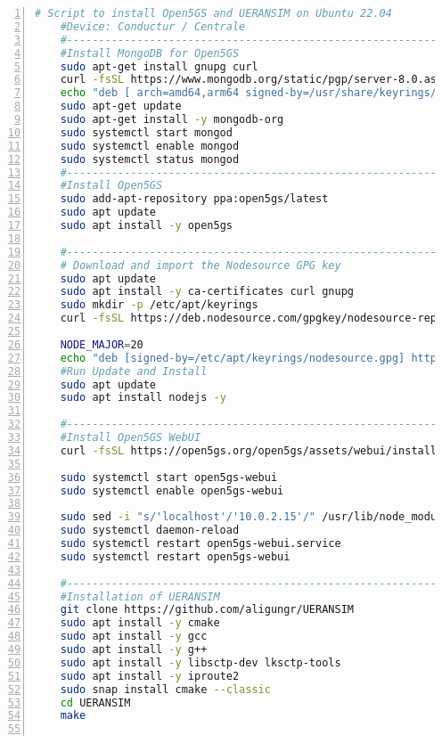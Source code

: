 \begin{lstlisting}[basicstyle=\small, frame=single, breaklines=true, postbreak=\mbox{\textcolor{red}{$\hookrightarrow$}\space}, escapeinside ={\%,}, escapechar={!}, numbers=left, language=sh, caption=Script]
    # Script to install Open5GS and UERANSIM on Ubuntu 22.04
    #Device: Conductur / Centrale
    #-----------------------------------------------------------
    #Install MongoDB for Open5GS
    sudo apt-get install gnupg curl
    curl -fsSL https://www.mongodb.org/static/pgp/server-8.0.asc | sudo gpg -o /usr/share/keyrings/mongodb-server-8.0.gpg --dearmor
    echo "deb [ arch=amd64,arm64 signed-by=/usr/share/keyrings/mongodb-server-8.0.gpg ] https://repo.mongodb.org/apt/ubuntu noble/mongodb-org/8.0 multiverse" | sudo tee /etc/apt/sources.list.d/mongodb-org-8.0.list
    sudo apt-get update
    sudo apt-get install -y mongodb-org
    sudo systemctl start mongod
    sudo systemctl enable mongod
    sudo systemctl status mongod
    #-----------------------------------------------------------
    #Install Open5GS
    sudo add-apt-repository ppa:open5gs/latest
    sudo apt update
    sudo apt install -y open5gs

    #-----------------------------------------------------------
    # Download and import the Nodesource GPG key
    sudo apt update
    sudo apt install -y ca-certificates curl gnupg
    sudo mkdir -p /etc/apt/keyrings
    curl -fsSL https://deb.nodesource.com/gpgkey/nodesource-repo.gpg.key | sudo gpg --dearmor -o /etc/apt/keyrings/nodesource.gpg

    NODE_MAJOR=20
    echo "deb [signed-by=/etc/apt/keyrings/nodesource.gpg] https://deb.nodesource.com/node_$NODE_MAJOR.x nodistro main" | sudo tee /etc/apt/sources.list.d/nodesource.list
    #Run Update and Install
    sudo apt update
    sudo apt install nodejs -y

    #-----------------------------------------------------------
    #Install Open5GS WebUI
    curl -fsSL https://open5gs.org/open5gs/assets/webui/install | sudo -E bash -

    sudo systemctl start open5gs-webui
    sudo systemctl enable open5gs-webui

    sudo sed -i "s/'localhost'/'10.0.2.15'/" /usr/lib/node_modules/open5gs/server/index.js # Change localhost
    sudo systemctl daemon-reload
    sudo systemctl restart open5gs-webui.service
    sudo systemctl restart open5gs-webui

    #-----------------------------------------------------------
    #Installation of UERANSIM
    git clone https://github.com/aligungr/UERANSIM
    sudo apt install -y cmake
    sudo apt install -y gcc
    sudo apt install -y g++
    sudo apt install -y libsctp-dev lksctp-tools
    sudo apt install -y iproute2
    sudo snap install cmake --classic
    cd UERANSIM
    make


\end{lstlisting}
